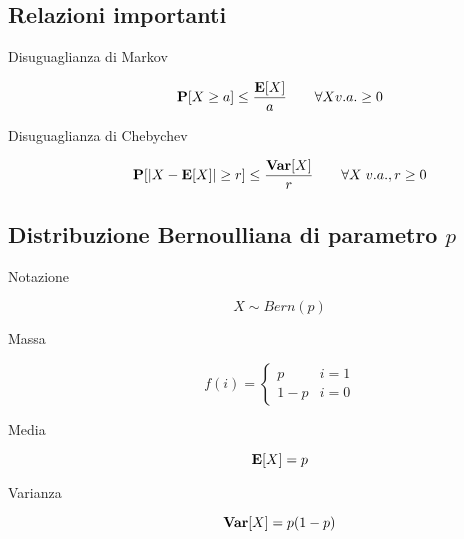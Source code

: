 \subsection{Relazioni importanti}

\begin{description}
	
	\item [Disuguaglianza di Markov]
		\begin{equation}
		\mathbf{P}[X \geq a] \leq \frac{\mathbf{E}[X]}{a} \qquad\forall X v.a. \geq 0
		\end{equation}
		
	\item [Disuguaglianza di Chebychev]
		\begin{equation}
		\mathbf{P}[|X-\mathbf{E}[X]| \geq r] \leq \frac{\mathbf{Var}[X]}{r} \qquad\forall X \; v.a., r \geq 0
		\end{equation}

\end{description}

\subsection{Distribuzione Bernoulliana di parametro $p$}

\begin{description}
	
	\item [Notazione]
		\begin{equation}
		X \sim Bern(p)
		\end{equation}

	\item [Massa]
		\begin{equation}
		f(i) = \left\{\begin{matrix}
		p & i=1\\
		1-p & i=0
		\end{matrix}\right.
		\end{equation}
		
	\item [Media]
		\begin{equation}
		\mathbf{E}[X]=p
		\end{equation}
		
	\item [Varianza]
		\begin{equation}
		\mathbf{Var}[X]=p(1-p)
		\end{equation}
		
\end{description}

